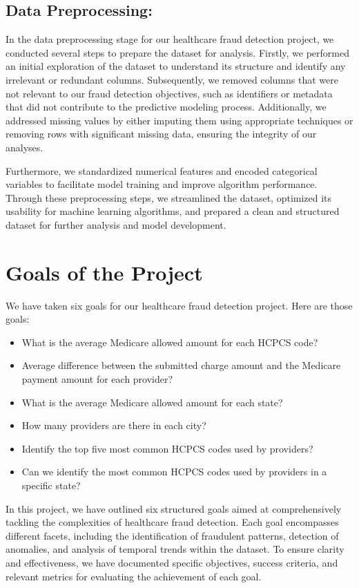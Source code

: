 \documentclass{article}
\begin{document}
\subsection{Data Preprocessing:}
\hspace{1cm}In the data preprocessing stage for our healthcare fraud detection project, we conducted several steps to prepare the dataset for analysis. Firstly, we performed an initial exploration of the dataset to understand its structure and identify any irrelevant or redundant columns. Subsequently, we removed columns that were not relevant to our fraud detection objectives, such as identifiers or metadata that did not contribute to the predictive modeling process. Additionally, we addressed missing values by either imputing them using appropriate techniques or removing rows with significant missing data, ensuring the integrity of our analyses. 

\hspace{0.5cm}Furthermore, we standardized numerical features and encoded categorical variables to facilitate model training and improve algorithm performance. Through these preprocessing steps, we streamlined the dataset, optimized its usability for machine learning algorithms, and prepared a clean and structured dataset for further analysis and model development.

\section{\textbf{Goals of the Project}}
\hspace{1cm}We have taken six goals for our healthcare fraud detection project. Here are those goals:
\begin{itemize}
    \item What is the average Medicare allowed amount for each HCPCS code?
    \item Average difference between the submitted charge amount and the Medicare payment amount         for each provider?
    \item What is the average Medicare allowed amount for each state?
    \item How many providers are there in each city?
    \item Identify the top five most common HCPCS codes used by providers?
    \item Can we identify the most common HCPCS codes used by providers in a specific state?
\end{itemize} 
\hspace{1cm}In this project, we have outlined six structured goals aimed at comprehensively tackling the complexities of healthcare fraud detection. Each goal encompasses different facets, including the identification of fraudulent patterns, detection of anomalies, and analysis of temporal trends within the dataset. To ensure clarity and effectiveness, we have documented specific objectives, success criteria, and relevant metrics for evaluating the achievement of each goal. 
\end{document}
